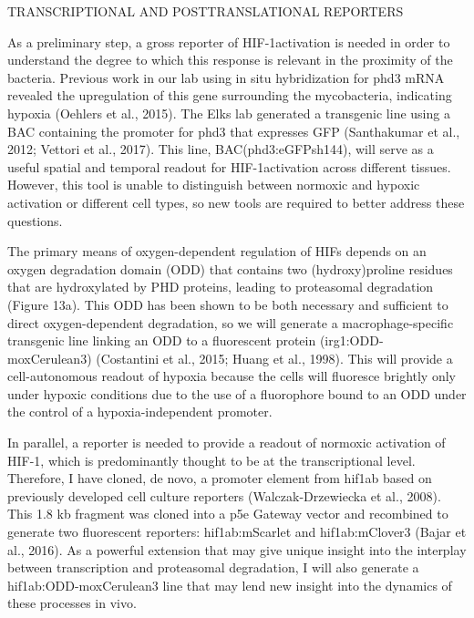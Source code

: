 TRANSCRIPTIONAL AND POSTTRANSLATIONAL REPORTERS

As a preliminary step, a gross reporter of HIF-1\textalpha activation is needed in order to understand the degree to which this response is relevant in the proximity of the bacteria. Previous work in our lab using in situ hybridization for phd3 mRNA revealed the upregulation of this gene surrounding the mycobacteria, indicating hypoxia (Oehlers et al., 2015). The Elks lab generated a transgenic line using a BAC containing the promoter for phd3 that expresses GFP (Santhakumar et al., 2012; Vettori et al., 2017). This line, BAC(phd3:eGFPsh144), will serve as a useful spatial and temporal readout for HIF-1\textalpha activation across different tissues. However, this tool is unable to distinguish between normoxic and hypoxic activation or different cell types, so new tools are required to better address these questions. 

The primary means of oxygen-dependent regulation of HIFs depends on an oxygen degradation domain (ODD) that contains two (hydroxy)proline residues that are hydroxylated by PHD proteins, leading to proteasomal degradation (Figure 13a). This ODD has been shown to be both necessary and sufficient to direct oxygen-dependent degradation, so we will generate a macrophage-specific transgenic line linking an ODD to a fluorescent protein (irg1:ODD-moxCerulean3) (Costantini et al., 2015; Huang et al., 1998). This will provide a cell-autonomous readout of hypoxia because the cells will fluoresce brightly only under hypoxic conditions due to the use of a fluorophore bound to an ODD under the control of a hypoxia-independent promoter.

In parallel, a reporter is needed to provide a readout of normoxic activation of HIF-1\textalpha, which is predominantly thought to be at the transcriptional level. Therefore, I have cloned, de novo, a promoter element from hif1ab based on previously developed cell culture reporters (Walczak-Drzewiecka et al., 2008). This 1.8 kb fragment was cloned into a p5e Gateway vector and recombined to generate two fluorescent reporters: hif1ab:mScarlet and hif1ab:mClover3 (Bajar et al., 2016). As a powerful extension that may give unique insight into the interplay between transcription and proteasomal degradation, I will also generate a hif1ab:ODD-moxCerulean3 line that may lend new insight into the dynamics of these processes in vivo. 

